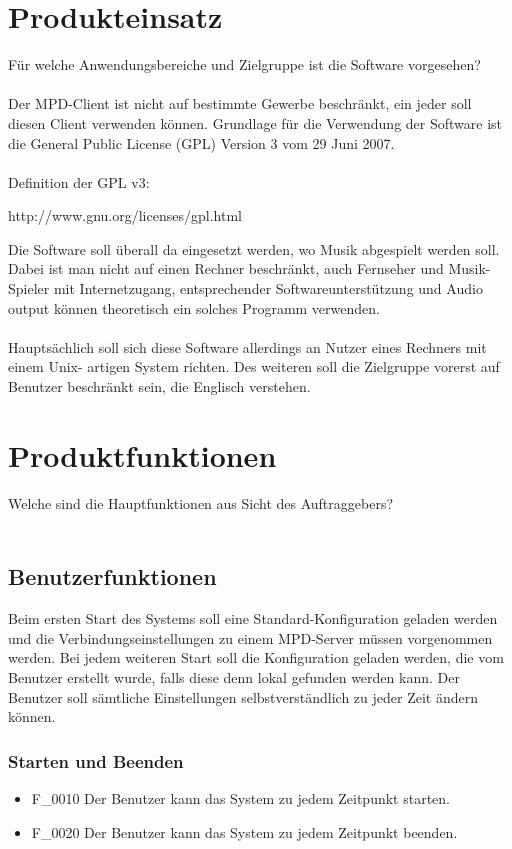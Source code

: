 \section{Produkteinsatz}
Für welche Anwendungsbereiche und Zielgruppe ist die Software vorgesehen?\ \\ \\
Der MPD-Client ist nicht auf bestimmte Gewerbe beschränkt, ein jeder soll diesen
Client verwenden können. Grundlage für die Verwendung der Software ist die General
Public License (GPL) Version 3 vom 29 Juni 2007.\ \\ \\
Definition der GPL v3:
\begin{center}
	http://www.gnu.org/licenses/gpl.html
\end{center}
Die Software soll überall da eingesetzt werden, wo Musik abgespielt werden soll. 
Dabei ist man nicht auf einen Rechner beschränkt, auch Fernseher und Musik-Spieler
mit Internetzugang, entsprechender Softwareunterstützung und Audio output können 
theoretisch ein solches Programm verwenden.\ \\ \\
Hauptsächlich soll sich diese Software allerdings an Nutzer eines Rechners mit einem Unix-
artigen System richten. Des weiteren soll die Zielgruppe vorerst auf Benutzer beschränkt
sein, die Englisch verstehen.
\section{Produktfunktionen}
Welche sind die Hauptfunktionen aus Sicht des Auftraggebers?\ \\ \\
\subsection{Benutzerfunktionen}
Beim ersten Start des Systems soll eine Standard-Konfiguration geladen werden und die Verbindungseinstellungen
zu einem MPD-Server müssen vorgenommen werden. Bei jedem weiteren Start soll die Konfiguration geladen werden,
die vom Benutzer erstellt wurde, falls diese denn lokal gefunden werden kann. Der Benutzer soll sämtliche
Einstellungen selbstverständlich zu jeder Zeit ändern können.
\subsubsection{Starten und Beenden}
\begin{itemize}
	\item F\_0010 Der Benutzer kann das System zu jedem Zeitpunkt starten.
	\item F\_0020 Der Benutzer kann das System zu jedem Zeitpunkt beenden.
\end{itemize}

